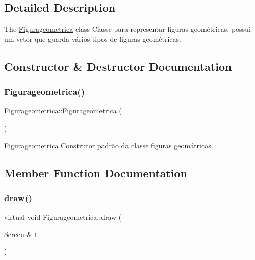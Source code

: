 \subsection{Detailed Description}
The \mbox{\hyperlink{class_figurageometrica}{Figurageometrica}} class Classe para representar figuras geométricas, possui um vetor que guarda vários tipos de figuras geométricas. 

\subsection{Constructor \& Destructor Documentation}
\mbox{\label{class_figurageometrica_aaa6a63e714e6ee3e884d17a5151b1ec4}} 
\subsubsection{\texorpdfstring{Figurageometrica()}{Figurageometrica()}}
{\footnotesize\ttfamily Figurageometrica\+::\+Figurageometrica (\begin{DoxyParamCaption}{ }\end{DoxyParamCaption})}



\mbox{\hyperlink{class_figurageometrica}{Figurageometrica}} Construtor padrão da classe figuras geomátricas. 



\subsection{Member Function Documentation}
\mbox{\label{class_figurageometrica_a68d9aba508879bb7a9ea1fe9d1d4f5f4}} 
\subsubsection{\texorpdfstring{draw()}{draw()}}
{\footnotesize\ttfamily virtual void Figurageometrica\+::draw (\begin{DoxyParamCaption}\item[{\mbox{\hyperlink{class_screen}{Screen}} \&}]{t }\end{DoxyParamCaption})\hspace{0.3cm}{\ttfamily [pure virtual]}}



